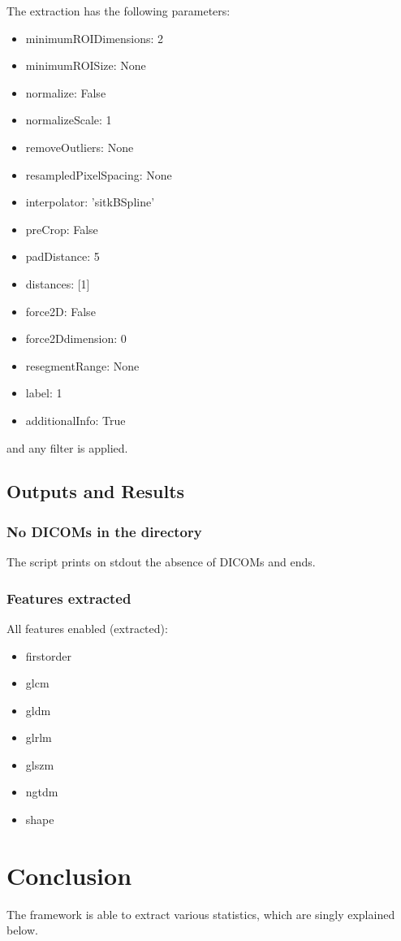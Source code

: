 \documentclass[12pt]{article}
\begin{document}
The extraction has the following parameters:
	\begin{itemize}
		\item minimumROIDimensions: 2
		\item minimumROISize: None
		\item normalize: False
		\item normalizeScale: 1
		\item removeOutliers: None
		\item resampledPixelSpacing: None
		\item interpolator: 'sitkBSpline'
		\item preCrop: False
		\item padDistance: 5
		\item distances: [1]
		\item force2D: False
		\item force2Ddimension: 0
		\item resegmentRange: None
		\item label: 1
		\item additionalInfo: True
	\end{itemize}
and any filter is applied.

	\subsection{Outputs and Results}
	\subsubsection{No DICOMs in the directory}
The script prints on stdout the absence of DICOMs and ends.

	\subsubsection{Features extracted}
All features enabled (extracted):
	\begin{itemize}
		\item firstorder
		\item glcm
		\item gldm
		\item glrlm
		\item glszm
		\item ngtdm
		\item shape
	\end{itemize}

	\pagebreak
	\section{Conclusion}\label{sec:con}
The framework is able to extract various statistics, which are singly explained below.
\end{document}
